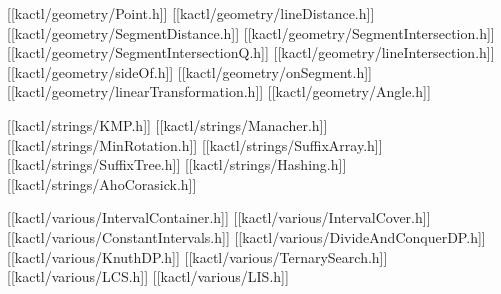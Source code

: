 [[kactl/geometry/Point.h]]
[[kactl/geometry/lineDistance.h]]
[[kactl/geometry/SegmentDistance.h]]
[[kactl/geometry/SegmentIntersection.h]]
[[kactl/geometry/SegmentIntersectionQ.h]]
[[kactl/geometry/lineIntersection.h]]
[[kactl/geometry/sideOf.h]]
[[kactl/geometry/onSegment.h]]
[[kactl/geometry/linearTransformation.h]]
[[kactl/geometry/Angle.h]]

[[kactl/strings/KMP.h]]
[[kactl/strings/Manacher.h]]
[[kactl/strings/MinRotation.h]]
[[kactl/strings/SuffixArray.h]]
[[kactl/strings/SuffixTree.h]]
[[kactl/strings/Hashing.h]]
[[kactl/strings/AhoCorasick.h]]

[[kactl/various/IntervalContainer.h]]
[[kactl/various/IntervalCover.h]]
[[kactl/various/ConstantIntervals.h]]
[[kactl/various/DivideAndConquerDP.h]]
[[kactl/various/KnuthDP.h]]
[[kactl/various/TernarySearch.h]]
[[kactl/various/LCS.h]]
[[kactl/various/LIS.h]]

\singlecolumn
\bye
